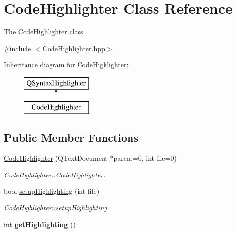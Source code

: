 \hypertarget{classCodeHighlighter}{\section{Code\+Highlighter Class Reference}
\label{classCodeHighlighter}
}


The \hyperlink{classCodeHighlighter}{Code\+Highlighter} class.  




{\ttfamily \#include $<$Code\+Highlighter.\+hpp$>$}

Inheritance diagram for Code\+Highlighter\+:\begin{figure}[H]
\begin{center}
\leavevmode
\includegraphics[height=2.000000cm]{classCodeHighlighter}
\end{center}
\end{figure}
\subsection*{Public Member Functions}
\begin{DoxyCompactItemize}
\item 
\hyperlink{classCodeHighlighter_aefbf2c4ec8b87c39aac8b4caf516765b}{Code\+Highlighter} (Q\+Text\+Document $\ast$parent=0, int file=0)
\begin{DoxyCompactList}\small\item\em \hyperlink{classCodeHighlighter_aefbf2c4ec8b87c39aac8b4caf516765b}{Code\+Highlighter\+::\+Code\+Highlighter}. \end{DoxyCompactList}\item 
bool \hyperlink{classCodeHighlighter_a61d21b1d88b955403a5d1e3601a22353}{setup\+Highlighting} (int file)
\begin{DoxyCompactList}\small\item\em \hyperlink{classCodeHighlighter_a61d21b1d88b955403a5d1e3601a22353}{Code\+Highlighter\+::setup\+Highlighting}. \end{DoxyCompactList}\item 
\hypertarget{classCodeHighlighter_a77d779445aeca5953113634e982ffac8}{int {\bfseries get\+Highlighting} ()}\label{classCodeHighlighter_a77d779445aeca5953113634e982ffac8}

\end{DoxyCompactItemize}
